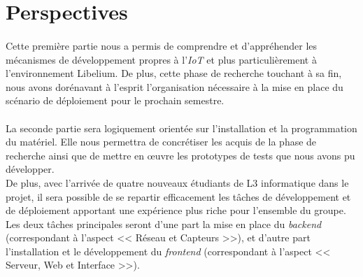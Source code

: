     
\section*{Perspectives}
    \paragraph{}Cette première partie nous a permis de comprendre et d'appréhender les mécanismes de développement propres à l'\emph{IoT} et plus particulièrement à l'environnement Libelium. De plus, cette phase de recherche touchant à sa fin, nous avons dorénavant à l'esprit l'organisation nécessaire à la mise en place du scénario de déploiement pour le prochain semestre.
    
    \paragraph{}La seconde partie sera logiquement orientée sur l'installation et la programmation du matériel. Elle nous permettra de concrétiser les acquis de la phase de recherche ainsi que de mettre en \oe uvre les prototypes de tests que nous avons pu développer.\\
    De plus, avec l'arrivée de quatre nouveaux étudiants de L3 informatique dans le projet, il sera possible de se repartir efficacement les tâches de développement et de déploiement apportant une expérience plus riche pour l'ensemble du groupe. Les deux tâches principales seront d'une part la mise en place du \emph{backend} (correspondant à l'aspect << Réseau et Capteurs >>), et d'autre part l'installation et le développement du \emph{frontend} (correspondant à l'aspect << Serveur, Web et Interface >>).